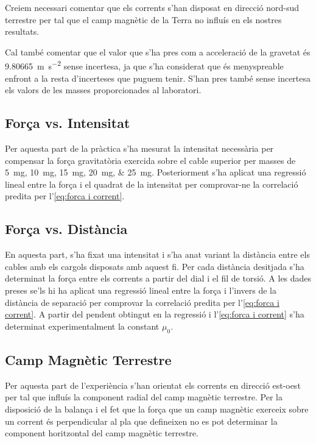 \begin{multicols}{2}
	Creiem necessari comentar que els corrents s'han disposat en direcció nord-sud terrestre per tal que el camp magnètic de la Terra no influís en els nostres resultats.

	Cal també comentar que el valor que s'ha pres com a acceleració de la gravetat és \SI{9.80665}{m.s^{-2}} sense incertesa, ja que s'ha considerat que és menyspreable enfront a la resta d'incerteses que puguem tenir. S'han pres també sense incertesa els valors de les masses proporcionades al laboratori.

	\subsection{Força vs. Intensitat}

	Per aquesta part de la pràctica s'ha mesurat la intensitat necessària per compensar la força gravitatòria exercida sobre el cable superior per masses de \SIlist{5; 10; 15; 20; 25}{mg}. Posteriorment s'ha aplicat una regressió lineal entre la força i el quadrat de la intensitat per comprovar-ne la correlació predita per l'\cref{eq:forca i corrent}.

	\subsection{Força vs. Distància}
	En aquesta part, s'ha fixat una intensitat i s'ha anat variant la distància entre els cables amb els cargols disposats amb aquest fi. Per cada distància desitjada s'ha determinat la força entre els corrents a partir del dial i el fil de torsió. A les dades preses se'ls hi ha aplicat una regressió lineal entre la força i l'invers de la distància de separació per comprovar la correlació predita per l'\cref{eq:forca i corrent}. A partir del pendent obtingut en la regressió i l'\cref{eq:forca i corrent} s'ha determinat experimentalment la constant $\mu_0$.

	\subsection{Camp Magnètic Terrestre}
	Per aquesta part de l'experiència %
	s'han orientat els corrents en direcció est-oest per tal que influís la component radial del camp magnètic terrestre. Per la disposició de la balança i el fet que la força que un camp magnètic exerceix sobre un corrent és perpendicular al pla que defineixen no es pot determinar la component horitzontal del camp magnètic terrestre.


\end{multicols}
